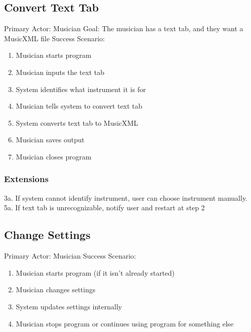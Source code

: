 \documentclass[11pt]{article}
\begin{document}
\subsection{Convert Text Tab}
\label{sec:orgbfbcbcb}
Primary Actor: Musician
Goal: The musician has a text tab, and they want a MusicXML file
Success Scenario:
\begin{enumerate}
\item Musician starts program
\item Musician inputs the text tab
\item System identifies what instrument it is for
\item Musician tells system to convert text tab
\item System converts text tab to MusicXML
\item Musician saves output
\item Musician closes program
\end{enumerate}

\subsubsection{Extensions}
\label{sec:orga0f60d6}
3a. If system cannot identify instrument, user can choose instrument manually.
5a. If text tab is unrecognizable, notify user and restart at step 2

\subsection{Change Settings}
\label{sec:org5d4a5f7}
Primary Actor: Musician
Success Scenario:
\begin{enumerate}
\item Musician starts program (if it isn't already started)
\item Musician changes settings
\item System updates settings internally
\item Musician stops program or continues using program for something else
\end{enumerate}
\end{document}
